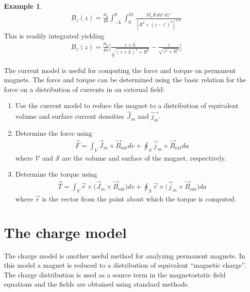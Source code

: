 \documentclass[11pt,a4paper,oneside]{book}
\numberwithin{equation}{section}
\theoremstyle{it}
\theoremstyle{definition}
\newtheorem{example}{Example}[section]
\begin{document}
\begin{example}
\begin{equation*}\label{}
	\begin{aligned}
		{B}_z(z) = \frac{\mu_0}{4\pi}\int_{-L}^{0}\int_{0}^{2\pi} \frac{M_sR\,d\phi'\,dz'}{[R^2+(z-z')^2]^{3/2}}
	\end{aligned}
\end{equation*}
This is readily integrated yielding 
\begin{equation}\label{current_model_10}
	\begin{aligned}
		{B}_z(z) = \frac{\mu_0}{4\pi}\Bigg[\frac{z+L}{\sqrt{(z+L)^2+R^2}}-\frac{z}{\sqrt{z^2+R^2}}\Bigg]
	\end{aligned}
\end{equation}
\end{example}
The current model is useful for computing the force and torque on permanent magnets. The force and torque can be determined using the basic relation for the force on a distribution of currents in an external field:
\begin{enumerate}
	\item Use the current model to reduce the magnet to a distribution of equivalent volume and surface current densities $\vec{J}_m$ and $\vec{j_m}$.
	\item Determine the force using
\begin{equation}\label{current_model_11}
\boxed{	\begin{aligned}
		\vec{F} = \int_{V} \vec{J}_m\times\vec{B}_{\text{ext}}dv+\oint_{S}\vec{j}_m\times\vec{B}_{\text{ext}}da
	\end{aligned}}
\end{equation}
where $\mathcal{V}$ and $\mathcal{S}$ are the volume and surface of the magnet, respectively.
\item Determine the torque using
 \begin{equation}\label{current_model_12}
 	\boxed{	\begin{aligned}
 			\vec{T} = \int_{V} \vec{r}\times\Big(\vec{J}_m\times\vec{B}_{\text{ext}}\Big)dv+\oint_{S}\vec{r}\times\Big(\vec{j}_m\times\vec{B}_{\text{ext}}\Big)da
 	\end{aligned}}
 \end{equation}
where $\vec{r}$ is the vector from the point about which the torque is computed.
\end{enumerate}
\section{The charge model}
The charge model is another useful method for analyzing permanent magnets. In this model a magnet is reduced to a distribution of equivalent “magnetic charge”. The charge distribution is used as a source term in the magnetostatic field equations and the fields are obtained using standard methods.
\end{document}
